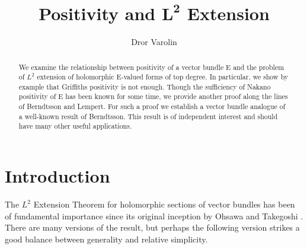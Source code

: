 \documentclass[12pt,hidelinks]{amsart}
\title{Positivity and $\mathbf{L^2}$ Extension}
\author{Dror Varolin}
\begin{document}

\theoremstyle{plain}
\newtheorem{m-thm}{\sc Theorem}
\newtheorem*{s-thm}{\sc Theorem}
\newtheorem{lem}{\sc Lemma}[section]
\newtheorem{thm}[lem]{\sc Theorem}
\newtheorem{prop}[lem]{\sc Proposition}
\newtheorem{cor}[lem]{\sc Corollary}

\theoremstyle{definition}
\newtheorem{conj}[lem]{\sc Conjecture}
\newtheorem*{sconj}{\sc Conjecture}
\newtheorem{prob}[lem]{\sc Open Problem}
\newtheorem{defn}[lem]{\sc Definition}
\newtheorem*{s-defn}{\sc Definition}
\newtheorem{qn}[lem]{\sc Question}
\newtheorem{ex}[lem]{\sc Example}
\newtheorem{rmk}[lem]{\sc Remark}
\newtheorem*{s-ex}{\sc Example}
\newtheorem*{s-qn}{\sc Question}
\newtheorem*{s-prop}{\sc Proposition}
\newtheorem*{s-rmk}{\sc Remark}
\newtheorem*{s-rmks}{\sc Remarks}
\newtheorem{rmks}[lem]{\sc Remarks}
\newtheorem*{ack}{\sc Acknowledgments}
\newtheorem*{notation}{\sc \underline{Notation}}

\renewcommand\thesubsubsection{\thesubsection.\roman{subsubsection}}

\begin{abstract}
We examine the relationship between positivity of a vector bundle E and the problem of $L^2$ extension of holomorphic E-valued forms of top degree. In particular, we show by example that Griffiths positivity is not enough. Though the sufficiency of Nakano positivity of E has been known for some time, we provide another proof along the lines of Berndtsson and Lempert. For such a proof we establish a vector bundle analogue of a well-known result of Berndtsson. This result is of independent interest and should have many other useful applications.
\end{abstract}


\maketitle

\section{Introduction}

The $L^2$ Extension Theorem for holomorphic sections of vector bundles has been of fundamental importance since its original inception by Ohsawa and Takegoshi \cite{ot}.  There are many versions of the result, but perhaps the following version strikes a good balance between generality and relative simplicity.
\end{document}
